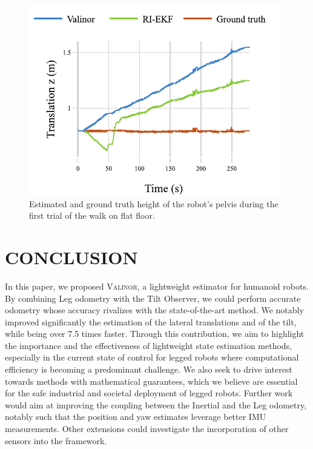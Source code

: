 \documentclass{IJCAS}
\begin{document}
\begin{figure}[!h]
\begin{center}
\includegraphics[width=\columnwidth]{Uploaded/Images/trans_z.pdf} 
\vskip -0.5pc
\caption{Estimated and ground truth height of the robot's pelvis during the first trial of the walk on flat floor.}\label{fig:trans_z_rhps1}
\end{center}
\vskip -1.5pc
\end{figure}

\section{CONCLUSION}

In this paper, we proposed {\scshape Valinor}, a lightweight estimator for humanoid robots. By combining Leg odometry with the Tilt Observer, we could perform accurate odometry whose accuracy rivalizes with the state-of-the-art method. We notably improved significantly the estimation of the lateral translations and of the tilt, while being over 7.5 times faster. Through this contribution, we aim to highlight the importance and the effectiveness of lightweight state estimation methods, especially in the current state of control for legged robots where computational efficiency is becoming a predominant challenge. We also seek to drive interest towards methods with mathematical guarantees, which we believe are essential for the safe industrial and societal deployment of legged robots. 
Further work would aim at improving the coupling between the Inertial and the Leg odometry, notably such that the position and yaw estimates leverage better IMU measurements. Other extensions could investigate the incorporation of other sensors into the framework.
\end{document}

